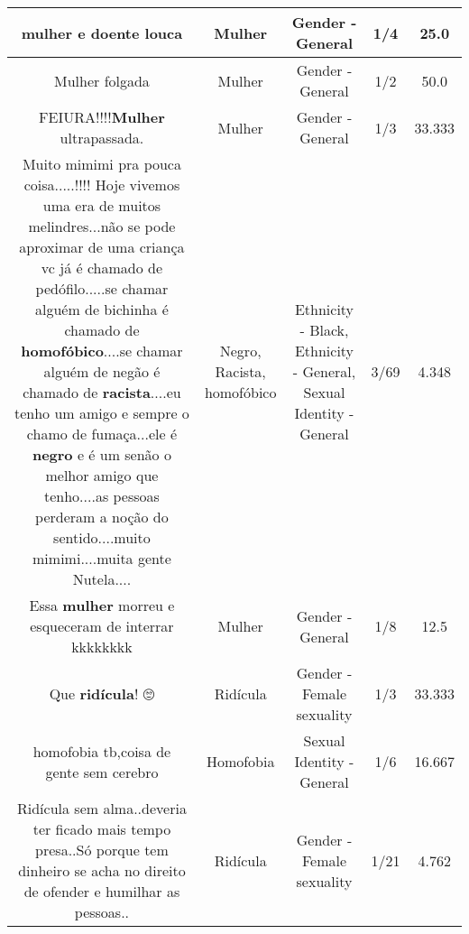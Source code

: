 \documentclass[11pt]{article}
\newlength\mylength
\begin{document}
\begin{center}
\begin{longtable}{|C{.65\mylength}|C{.30\mylength}|C{.12\mylength}|C{.12\mylength}|C{.12\mylength}|}
  \small mulher e doente louca\normalsize   & Mulher & Gender - General & 1/4 & 25.0 \\  \hline
  \small Mulher folgada\normalsize   & Mulher & Gender - General & 1/2 & 50.0 \\  \hline
  \small FEIURA!!!!\textbf{Mulher} ultrapassada.\normalsize   & Mulher & Gender - General & 1/3 & 33.333 \\  \hline
  \small Muito mimimi pra pouca coisa.....!!!! Hoje vivemos uma era de muitos melindres...não se pode aproximar de uma criança vc já é chamado de pedófilo.....se chamar alguém de bichinha é chamado de \textbf{homofóbico}....se chamar alguém de negão é chamado de \textbf{racista}....eu tenho um amigo e sempre o chamo de fumaça...ele é \textbf{negro} e é um senão o melhor amigo que tenho....as pessoas perderam a noção do sentido....muito mimimi....muita gente Nutela....\normalsize   & Negro, Racista, homofóbico & Ethnicity - Black, Ethnicity - General, Sexual Identity - General & 3/69 & 4.348 \\  \hline
  \small Essa \textbf{mulher} morreu e esqueceram de interrar kkkkkkkk\normalsize   & Mulher & Gender - General & 1/8 & 12.5 \\  \hline
  \small Que \textbf{ridícula}! 🙄\normalsize   & Ridícula & Gender - Female sexuality & 1/3 & 33.333 \\  \hline
  \small homofobia tb,coisa de gente sem cerebro\normalsize   & Homofobia & Sexual Identity - General & 1/6 & 16.667 \\  \hline
  \small Ridícula sem alma..deveria ter ficado mais tempo presa..Só porque tem dinheiro se acha no direito de ofender e humilhar as pessoas..\normalsize   & Ridícula & Gender - Female sexuality & 1/21 & 4.762 \\  \hline

\end{longtable}
\end{center}
\end{document}

